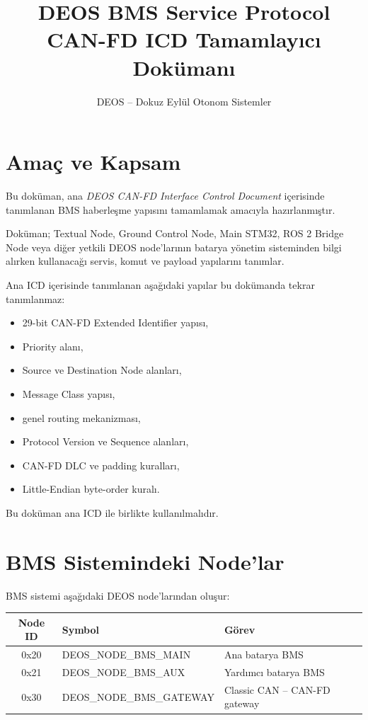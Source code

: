 \documentclass[a4paper,10pt]{article}
\title{\textbf{DEOS BMS Service Protocol}\\
\large CAN-FD ICD Tamamlayıcı Dokümanı}
\author{DEOS -- Dokuz Eylül Otonom Sistemler}
\date{}
\begin{document}
\maketitle

\section{Amaç ve Kapsam}

Bu doküman, ana \textit{DEOS CAN-FD Interface Control Document}
içerisinde tanımlanan BMS haberleşme yapısını tamamlamak amacıyla
hazırlanmıştır.

Doküman; Textual Node, Ground Control Node, Main STM32,
ROS 2 Bridge Node veya diğer yetkili DEOS node'larının batarya yönetim
sisteminden bilgi alırken kullanacağı servis, komut ve payload
yapılarını tanımlar.

Ana ICD içerisinde tanımlanan aşağıdaki yapılar bu dokümanda tekrar
tanımlanmaz:

\begin{itemize}[nosep]
    \item 29-bit CAN-FD Extended Identifier yapısı,
    \item Priority alanı,
    \item Source ve Destination Node alanları,
    \item Message Class yapısı,
    \item genel routing mekanizması,
    \item Protocol Version ve Sequence alanları,
    \item CAN-FD DLC ve padding kuralları,
    \item Little-Endian byte-order kuralı.
\end{itemize}

Bu doküman ana ICD ile birlikte kullanılmalıdır.

\section{BMS Sistemindeki Node'lar}

BMS sistemi aşağıdaki DEOS node'larından oluşur:

\begin{center}
\begin{tabular}{c l l}
\toprule
\textbf{Node ID} & \textbf{Symbol} & \textbf{Görev} \\
\midrule

0x20 &
DEOS\_NODE\_BMS\_MAIN &
Ana batarya BMS \\

0x21 &
DEOS\_NODE\_BMS\_AUX &
Yardımcı batarya BMS \\

0x30 &
DEOS\_NODE\_BMS\_GATEWAY &
Classic CAN -- CAN-FD gateway \\

\bottomrule
\end{tabular}
\end{center}
\end{document}
